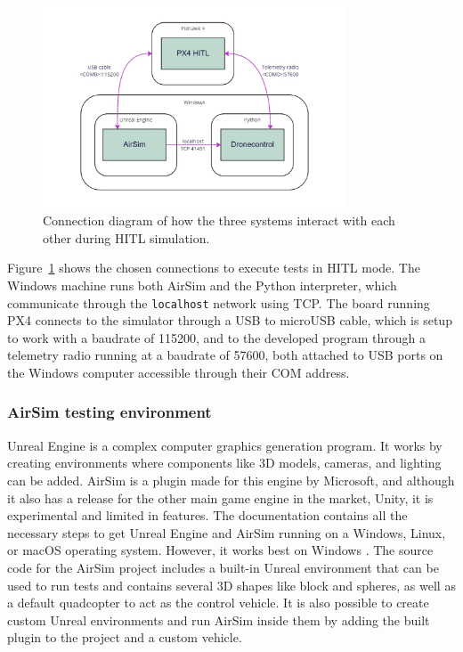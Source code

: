 \begin{figure}
  \centering
  \includegraphics[width=0.8\textwidth,keepaspectratio]{img/hitl-connections.jpg}
  \caption{Connection diagram of how the three systems interact with each other during HITL simulation.}\label{fig:hitl-connections}
\end{figure}

Figure~\ref{fig:hitl-connections} shows the chosen connections to execute tests in HITL mode.
The Windows machine runs both AirSim and the Python interpreter, which communicate through the \texttt{localhost} network using TCP.
The board running PX4 connects to the simulator through a USB to microUSB cable, which is setup to work with a baudrate of 115200, and to the developed program through a telemetry radio running at a baudrate of 57600, both attached to USB ports on the Windows computer accessible through their COM address.

\subsubsection{AirSim testing environment}

Unreal Engine is a complex computer graphics generation program.
It works by creating environments where components like 3D models, cameras, and lighting can be added.
AirSim is a plugin made for this engine by Microsoft, and although it also has a release for the other main game engine in the market, Unity, it is experimental and limited in features.
The documentation contains all the necessary steps to get Unreal Engine and AirSim running on a Windows, Linux, or macOS operating system. 
However, it works best on Windows \cite{build-airsim}.
The source code for the AirSim project includes a built-in Unreal environment that can be used to run tests and contains several 3D shapes like block and spheres, as well as a default quadcopter to act as the control vehicle.
It is also possible to create custom Unreal environments and run AirSim inside them by adding the built plugin to the project and a custom vehicle.


